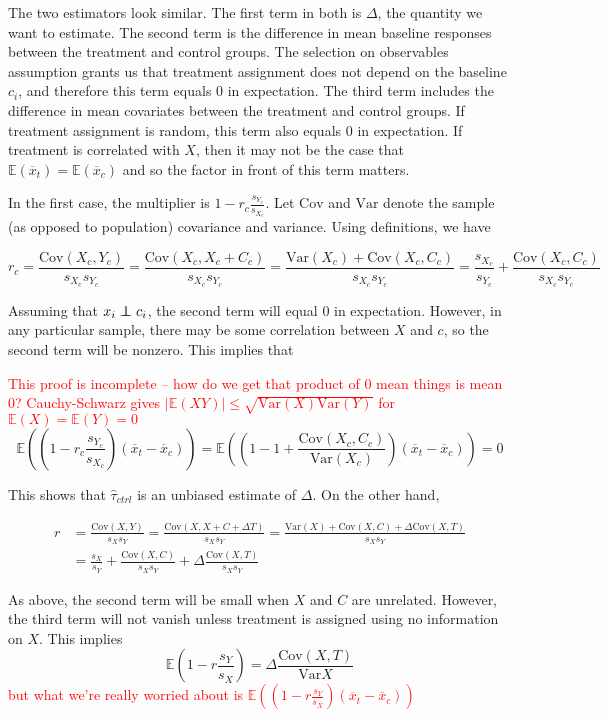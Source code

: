 \documentclass[12pt]{article}
\newcommand{\ex}{\mathbb{E}} %
\newcommand{\var}{\textrm{Var}}
\newcommand{\cov}{\textrm{Cov}}
\newcommand\independent{\protect\mathpalette{\protect\independenT}{\perp}}
\def\independenT#1#2{\mathrel{\rlap{$#1#2$}\mkern2mu{#1#2}}}
\begin{document}
The two estimators look similar.  The first term in both is $\Delta$, the quantity we want to estimate.  The second term is the difference in mean baseline responses between the treatment and control groups.  The selection on observables assumption grants us that treatment assignment does not depend on the baseline $c_i$, and therefore this term equals $0$ in expectation.  The third term includes the difference in mean covariates between the treatment and control groups.  If treatment assignment is random, this term also equals $0$ in expectation.  If treatment is correlated with $X$, then it may not be the case that $\ex(\overline{x}_t) = \ex(\overline{x}_c)$ and so the factor in front of this term matters. 

In the first case, the multiplier is $1 - r_c\frac{s_{Y_c}}{s_{X_c}}$.  Let $\cov$ and $\var$ denote the sample (as opposed to population) covariance and variance.  Using definitions, we have

$$r_c = \frac{\cov(X_c, Y_c)}{s_{X_c}s_{Y_c}} = \frac{\cov(X_c, X_c + C_c)}{s_{X_c}s_{Y_c}} = \frac{\var(X_c) + \cov(X_c, C_c)}{s_{X_c}s_{Y_c}}   = \frac{s_{X_c}}{s_{Y_c}} + \frac{\cov(X_c, C_c)}{s_{X_c}s_{Y_c}}$$

Assuming that $x_i \independent c_i$, the second term will equal $0$ in expectation.  However, in any particular sample, there may be some correlation between $X$ and $c$, so the second term will be nonzero.  This implies that

\textcolor{red}{This proof is incomplete -- how do we get that product of 0 mean things is mean 0? Cauchy-Schwarz gives $\lvert \ex(XY)\rvert \leq \sqrt{\var(X)\var(Y)}$ for $\ex(X) = \ex(Y) = 0$}
$$\ex\left( (1 - r_c\frac{s_{Y_c}}{s_{X_c}})(\overline{x}_t - \overline{x}_c) \right) = \ex\left( \left(1 - 1 + \frac{\cov(X_c, C_c)}{\var(X_c)}\right)(\overline{x}_t - \overline{x}_c) \right) = 0$$

This shows that $\hat{\tau}_{ctrl}$ is an unbiased estimate of $\Delta$.  On the other hand,

\begin{align*}
r &= \frac{\cov(X, Y)}{s_{X}s_{Y}} = \frac{\cov(X, X + C + \Delta T)}{s_{X}s_{Y}} = \frac{\var(X) + \cov(X, C) + \Delta\cov(X, T)}{s_{X}s_{Y}} \\
&= \frac{s_{X}}{s_{Y}} + \frac{\cov(X, C)}{s_{X}s_{Y}} + \Delta\frac{\cov(X, T)}{s_{X}s_{Y}}
\end{align*}

As above, the second term will be small when $X$ and $C$ are unrelated. However, the third term will not vanish unless treatment is assigned using no information on $X$.  This implies
$$\ex\left( 1 - r\frac{s_{Y}}{s_{X}} \right) = \Delta \frac{\cov(X, T)}{\var{X}} $$
\textcolor{red}{but what we're really worried about is $\ex((1- r\frac{s_{Y}}{s_{X}})(\overline{x}_t - \overline{x}_c))$}
\end{document}
